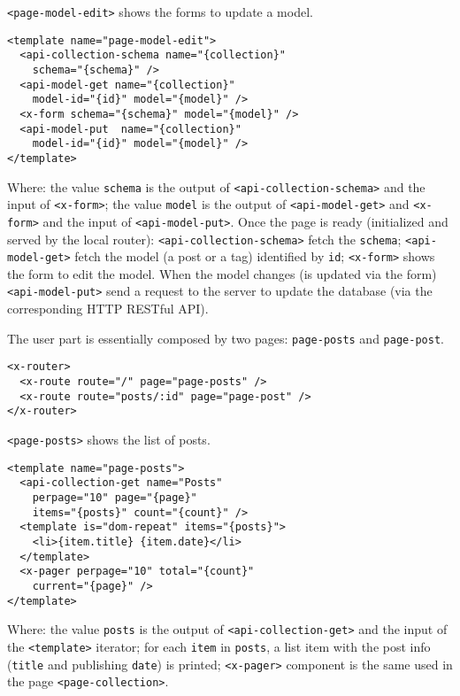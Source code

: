 \vspace{0.2cm}

\texttt{<page-model-edit>} shows the forms to update a model.

\begin{lstlisting}[language=HTML5]
<template name="page-model-edit">
  <api-collection-schema name="{collection}"
    schema="{schema}" />
  <api-model-get name="{collection}" 
    model-id="{id}" model="{model}" />
  <x-form schema="{schema}" model="{model}" />
  <api-model-put  name="{collection}"
    model-id="{id}" model="{model}" />
</template>
\end{lstlisting}

Where: 
the value \texttt{schema} is the output of \texttt{<api-collection-schema>} and the input of \texttt{<x-form>};
the value \texttt{model} is the output of \texttt{<api-model-get>} and \texttt{<x-form>} and the input of \texttt{<api-model-put>}.
Once the page is ready (initialized and served by the local router): 
\texttt{<api-collection-schema>} fetch the \texttt{schema}; 
\texttt{<api-model-get>} fetch the model (a post or a tag) identified by \texttt{id};
\texttt{<x-form>} shows the form to edit the model.
When the model changes (is updated via the form) \texttt{<api-model-put>} send a request to the server to update the database (via the corresponding HTTP RESTful API).


The user part is essentially composed by two pages: \texttt{page-posts} and \texttt{page-post}.

\begin{lstlisting}[language=HTML5]
<x-router>
  <x-route route="/" page="page-posts" />
  <x-route route="posts/:id" page="page-post" />
</x-router>
\end{lstlisting}

\texttt{<page-posts>} shows the list of posts.

\begin{lstlisting}[language=HTML5]
<template name="page-posts">
  <api-collection-get name="Posts"
    perpage="10" page="{page}" 
    items="{posts}" count="{count}" />
  <template is="dom-repeat" items="{posts}">
    <li>{item.title} {item.date}</li>
  </template>
  <x-pager perpage="10" total="{count}" 
    current="{page}" />
</template>
\end{lstlisting}

Where:
the value \texttt{posts} is the output of \texttt{<api-collection-get>} and the input of the \texttt{<template>} iterator; for each \texttt{item} in \texttt{posts}, a list item with the post info (\texttt{title} and publishing \texttt{date}) is printed;
\texttt{<x-pager>} component is the same used in the page \texttt{<page-collection>}.

